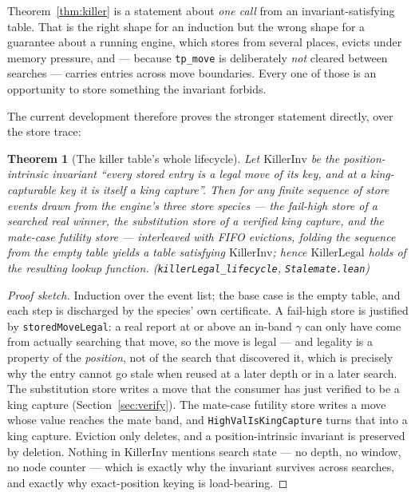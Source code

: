 \documentclass[11pt]{article}
\newcommand{\leanref}[2]{(\texttt{#1}, \texttt{#2})}%
\theoremstyle{plain}
\newtheorem{theorem}{Theorem}[section]
\theoremstyle{definition}
\theoremstyle{remark}
\begin{document}
Theorem~\ref{thm:killer} is a statement about \emph{one call} from an
invariant-satisfying table.  That is the right shape for an induction
but the wrong shape for a guarantee about a running engine, which
stores from several places, evicts under memory pressure, and ---
because \texttt{tp\_move} is deliberately \emph{not} cleared between
searches --- carries entries across move boundaries.  Every one of
those is an opportunity to store something the invariant forbids.

The current development therefore proves the stronger statement
directly, over the store trace:

\begin{theorem}[The killer table's whole lifecycle]
\label{thm:killerlife}
Let $\mathrm{KillerInv}$ be the position-intrinsic invariant ``every
stored entry is a legal move of its key, and at a king-capturable key
it is itself a king capture''.  Then for \emph{any} finite sequence of
store events drawn from the engine's three store species --- the
fail-high store of a searched real winner, the substitution store of a
verified king capture, and the mate-case futility store --- interleaved
with FIFO evictions, folding the sequence from the empty table yields a
table satisfying $\mathrm{KillerInv}$; hence $\mathrm{KillerLegal}$
holds of the resulting lookup function.
\leanref{killerLegal\_lifecycle}{Stalemate.lean}
\end{theorem}

\begin{proof}[Proof sketch]
Induction over the event list; the base case is the empty table, and
each step is discharged by the species' own certificate.  A fail-high
store is justified by \texttt{storedMoveLegal}: a real report at or
above an in-band $\gamma$ can only have come from actually searching
that move, so the move is legal --- and legality is a property of the
\emph{position}, not of the search that discovered it, which is
precisely why the entry cannot go stale when reused at a later depth or
in a later search.  The substitution store writes a move that the
consumer has just verified to be a king capture
(Section~\ref{sec:verify}).  The mate-case futility store writes a move
whose value reaches the mate band, and \texttt{HighValIsKingCapture}
turns that into a king capture.  Eviction only deletes, and a
position-intrinsic invariant is preserved by deletion.  Nothing in
$\mathrm{KillerInv}$ mentions search state --- no depth, no window, no
node counter --- which is exactly why the invariant survives across
searches, and exactly why exact-position keying is load-bearing.
\end{proof}
\end{document}

